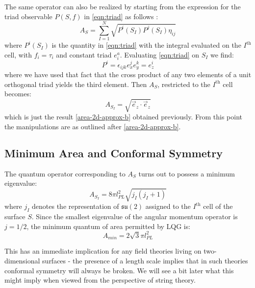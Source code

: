 \documentclass[submission, Phys]{SciPost}
\newcommand{\mf}[1]{\mathfrak{#1}}
\begin{document}
The same operator can also be realized by starting from the expression for the triad observable $ P(S,f) $ in \eqref{eqn:triad} as follows \cite[Sec 5.1.1]{Ashtekar2004Background}:
\begin{equation}\label{eqn:area-observable}
	A_S = \sum_{I=1}^{N}\sqrt{P^i(S_I) P^j(S_I) \eta_{ij}}
\end{equation}
where $ P^i(S_I) $ is the quantity in \eqref{eqn:triad} with the integral evaluated on the $ I^\text{th} $ cell, with $ f_i = \tau_i $ and constant triad $ e^a_i $. Evaluating \eqref{eqn:triad} on $ S_I $ we find:
\begin{equation}\label{eqn:triad-2}
	P^i = \epsilon_{ijk} e_x^j e_y^k = e_z^i
\end{equation}
where we have used that fact that the cross product of any two elements of a unit orthogonal triad yields the third element. Then $ A_S $, restricted to the $ I^\text{th} $ cell becomes:
\begin{equation}\label{eqn:area-2}
	A_{S_I} = \sqrt{ \vec{e}_z \cdot \vec{e}_z }
\end{equation}
which is just the result \eqref{area-2d-approx-b} obtained previously. From this point the manipulations are as outlined after \eqref{area-2d-approx-b}.

\subsection{Minimum Area and Conformal Symmetry}\label{sec:conformal}

The quantum operator corresponding to $ A_S $ turns out to possess a minimum eigenvalue:
\begin{equation}\label{eqn:area-eigenvalue}
	A_{S_I} = 8\pi l^2_{PL} \sqrt{j_I (j_I + 1)}
\end{equation}
where $ j_I $ denotes the representation of $ \mf{su}(2) $ assigned to the $ I^{\text{th}} $ cell of the surface $ S $. Since the smallest eigenvalue of the angular momentum operator is $ j = 1/2 $, the minimum quantum of area permitted by LQG is:
\begin{equation}\label{eqn:area-minimum}
	A_{min} = 2 \sqrt{3} \pi l^2_{PL} 
\end{equation}

This has an immediate implication for any field theories living on two-dimensional surfaces - the presence of a length scale implies that in such theories conformal symmetry will always be broken. We will see a bit later what this might imply when viewed from the perspective of string theory.
\end{document}
